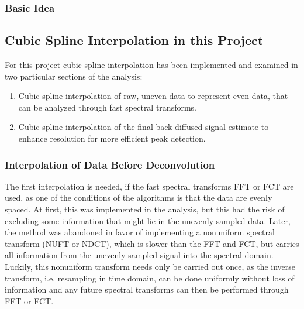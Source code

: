 \documentclass[../../CompleteThesis2/Complete_2ndDraft]{subfiles}
\begin{document}
\subsubsection[Basic Idea][Basic Idea]{Basic Idea}
\label{Subsubsec:CompMeths_SplinesAndInterpolation_Interpolation_BasicIdea}

\subsection[Interpolation in this Project][Interpolation in this Project]{Cubic Spline Interpolation in this Project}
\label{Subsec:CompMeths_SplinesAndInterpolation_InterpolationInThisProj}
For this project cubic spline interpolation has been implemented and examined in two particular sections of the analysis: 
\begin{enumerate}
	\item Cubic spline interpolation of raw, uneven data to represent even data, that can be analyzed through fast spectral transforms.
	\item Cubic spline interpolation of the final back-diffused signal estimate to enhance resolution for more efficient peak detection.
\end{enumerate}

\subsubsection[Interpolation 1]{Interpolation of Data Before Deconvolution}
\label{Subsubsec:CompMethod_StabilityTests_Interpolation1}

The first interpolation is needed, if the fast spectral transforms FFT or FCT are used, as one of the conditions of the algorithms is that the data are evenly spaced. At first, this was implemented in the analysis, but this had the risk of excluding some information that might lie in the unevenly sampled data. Later, the method was abandoned in favor of implementing a nonuniform spectral transform (NUFT or NDCT), which is slower than the FFT and FCT, but carries all information from the unevenly sampled signal into the spectral domain. Luckily, this nonuniform transform needs only be carried out once, as the inverse transform, i.e. resampling in time domain, can be done uniformly without loss of information and any future spectral transforms can then be performed through FFT or FCT.
\end{document}
